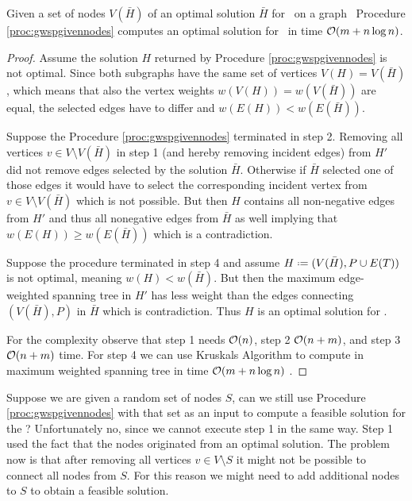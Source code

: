 \begin{theorem}
	\label{thm:wspgivennodes}
	Given a set of nodes $V(\bar{H})$ of an optimal solution $\bar{H}$ for \maxWSP\ on a graph \ugraph\ Procedure \ref{proc:gwspgivennodes} computes an optimal solution for \maxWSP\ in time $\mathcal{O}(m + n \log n)$.
\end{theorem}
\begin{proof}
	Assume the solution $H$ returned by Procedure \ref{proc:gwspgivennodes} is not optimal. Since both subgraphs have the same set of vertices $V(H) = V(\bar{H})$, which means that also the vertex weights $w(V(H)) = w(V(\bar{H}))$ are equal, the selected edges have to differ and $w(E(H)) < w(E(\bar{H}))$.\medskip
	
	Suppose the Procedure \ref{proc:gwspgivennodes} terminated in step 2. Removing all vertices $v \in V \setminus V(\bar{H})$ in step 1 (and hereby removing incident edges) from $H'$ did not remove edges selected by the solution $\bar{H}$. Otherwise if $\bar{H}$ selected one of those edges it would have to select the corresponding incident vertex from $v \in V \setminus V(\bar{H})$ which is not possible. But then $H$ contains all non-negative edges from $H'$ and thus all nonegative edges from $\bar{H}$ as well implying that $w(E(H)) \geq w(E(\bar{H}))$ which is a contradiction.\medskip
	
	Suppose the procedure terminated in step 4 and assume $H \defeq (V(\bar{H}), P \cup E(T))$ is not optimal, meaning $w(H) < w(\bar{H})$. But then the maximum edge-weighted spanning tree in $H'$ has less weight than the edges connecting $(V(\bar{H}), P)$ in $\bar{H}$ which is contradiction. Thus $H$ is an optimal solution for \maxWSP.\medskip
	
	For the complexity observe that step 1 needs $\mathcal{O}(n)$, step 2 $\mathcal{O}(n + m)$, and step 3 $\mathcal{O}(n + m)$ time. For step 4 we can use Kruskals Algorithm to compute in maximum weighted spanning tree in time $\mathcal{O}(m + n \log n)$ \cite{KN12}.
\end{proof}

Suppose we are given a random set of nodes $S$, can we still use Procedure \ref{proc:gwspgivennodes} with that set as an input to compute a feasible solution for the \WSP? Unfortunately no, since we cannot execute step 1 in the same way. Step 1 used the fact that the nodes originated from an optimal solution. The problem now is that after removing all vertices $v \in V \setminus S$ it might not be possible to connect all nodes from $S$. For this reason we might need to add additional nodes to $S$ to obtain a feasible solution.\medskip

